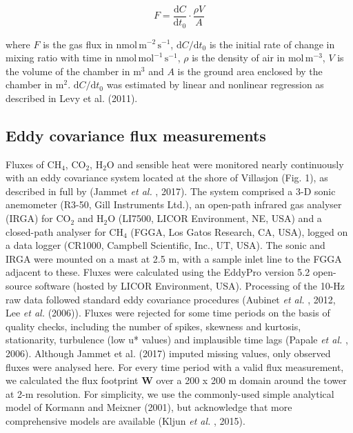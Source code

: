 \begin{equation}
 F = \frac{\mathrm{d}C}{\mathrm{d}t_0} \cdot \frac{\rho V}{A}

\end{equation}

where \(F\) is the gas flux in \(\mathrm{nmol\,m^{-2}\,s^{-1}}\),
\(\mathrm{d}C/\mathrm{d}t_0\) is the initial rate of change in mixing
ratio with time in \(\mathrm{nmol\,mol^{-1}\,s^{-1}}\), \(\rho\) is the
density of air in \(\mathrm{mol\,m^{-3}}\), \(V\) is the volume of the
chamber in \(\mathrm{m^3}\) and \(A\) is the ground area enclosed by the
chamber in \(\mathrm{m^2}\). \(\mathrm{d}C/\mathrm{d}t_0\) was estimated
by linear and nonlinear regression as described in Levy et al. (2011).

\subsection{Eddy covariance flux
measurements}\label{eddy-covariance-flux-measurements}

Fluxes of CH\(_4\), CO\(_2\), H\(_2\)O and sensible heat were monitored
nearly continuously with an eddy covariance system located at the shore
of Villasjon (Fig. 1), as described in full by (Jammet \emph{et al.} ,
2017). The system comprised a 3-D sonic anemometer (R3-50, Gill
Instruments Ltd.), an open-path infrared gas analyser (IRGA) for
CO\(_2\) and H\(_2\)O (LI7500, LICOR Environment, NE, USA) and a
closed-path analyser for CH\(_4\) (FGGA, Los Gatos Research, CA, USA),
logged on a data logger (CR1000, Campbell Scientific, Inc., UT, USA).
The sonic and IRGA were mounted on a mast at 2.5 m, with a sample inlet
line to the FGGA adjacent to these. Fluxes were calculated using the
EddyPro version 5.2 open-source software (hosted by LICOR Environment,
USA). Processing of the 10-Hz raw data followed standard eddy covariance
procedures (Aubinet \emph{et al.} , 2012, Lee \emph{et al.} (2006)).
Fluxes were rejected for some time periods on the basis of quality
checks, including the number of spikes, skewness and kurtosis,
stationarity, turbulence (low u* values) and implausible time lags
(Papale \emph{et al.} , 2006). Although Jammet et al. (2017) imputed
missing values, only observed fluxes were analysed here. For every time
period with a valid flux measurement, we calculated the flux footprint
\(\mathbf{W}\) over a 200 x 200 m domain around the tower at 2-m
resolution. For simplicity, we use the commonly-used simple analytical
model of Kormann and Meixner (2001), but acknowledge that more
comprehensive models are available (Kljun \emph{et al.} , 2015).


